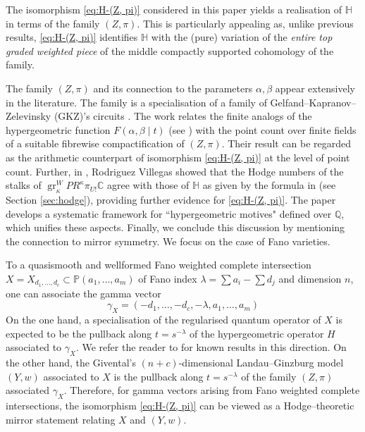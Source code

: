 \documentclass[11pt, reqno]{amsart}
\theoremstyle{plain}
\theoremstyle{definition}
\newcommand{\PP}{\mathbb{P}}
\newcommand{\CC}{\mathbb{C}}
\newcommand{\QQ}{\mathbb{Q}}
\newcommand{\HH}{\mathbb{H}}
\DeclareMathOperator{\gr}{gr}
\begin{document}
The isomorphism \eqref{eq:H-(Z, pi)} considered in this paper yields a realisation of $\HH$ in terms of the family $(Z, \pi)$. This is particularly appealing as, unlike previous results, \eqref{eq:H-(Z, pi)} identifies $\HH$ with the (pure) variation of the \emph{entire top graded weighted piece} of the middle compactly supported cohomology of the family. 

The family $(Z, \pi)$ and its connection to the parameters $\alpha, \beta$ appear extensively in the literature. 
The family is a specialisation of a family of Gelfand--Kapranov--Zelevinsky (GKZ)'s circuits \cite{GKZ}. 
The work \cite{BCM} relates the finite analogs of the hypergeometric function \mbox{$F(\alpha, \beta\mid t)$} (see \cite[Definition 1.1]{BCM})  with the point count over finite fields of a suitable fibrewise compactification of $(Z, \pi)$. Their result can be regarded as
the arithmetic counterpart of isomorphism \eqref{eq:H-(Z, pi)} at the level of point count. 
Further, in \cite{FRV-duke}, Rodriguez Villegas showed that the Hodge numbers of the stalks of $\gr_\kappa^W PR^\kappa \pi_{U !} \CC$ agree with those of $\HH$ as given by the formula in \cite{Fedorov} (see Section \ref{sec:hodge}), providing further evidence for \eqref{eq:H-(Z, pi)}.  
The paper \cite{RV} develops a systematic framework for ``hypergeometric motives" defined over $\QQ$, which unifies these aspects.
Finally, we conclude this discussion by mentioning the connection to mirror symmetry. We focus on the case of Fano varieties.

To a quasismooth and wellformed Fano weighted complete intersection $X=X_{d_1, \dots, d_c} \subset \PP(a_1, \dots, a_m)$ of Fano index $\lambda=\sum a_i -\sum d_j$ and dimension $n$, one can associate the gamma vector
\[
\gamma_X=(-d_1, \dots, -d_c, -\lambda, a_1, \dots, a_m)
\]
On the one hand, a specialisation of the regularised quantum operator of $X$ is expected to be the pullback along $t=s^{-\lambda}$ of the hypergeometric operator $H$ associated to $\gamma_X$. We refer the reader to \cite{T-stacks, Wang, AlessioG} for known results in this direction. 
On the other hand,  the Givental's  $(n+c)$-dimensional Landau--Ginzburg model $(Y,w)$ associated to $X$ \cite{GIV3} is the pullback along $t=s^{-\lambda}$ of the family $(Z, \pi)$ associated $\gamma_X$. 
Therefore, for gamma vectors arising from Fano weighted complete intersections, the isomorphism \eqref{eq:H-(Z, pi)} can be viewed as a Hodge--theoretic mirror statement relating $X$ and $(Y,w)$. 
\end{document}
